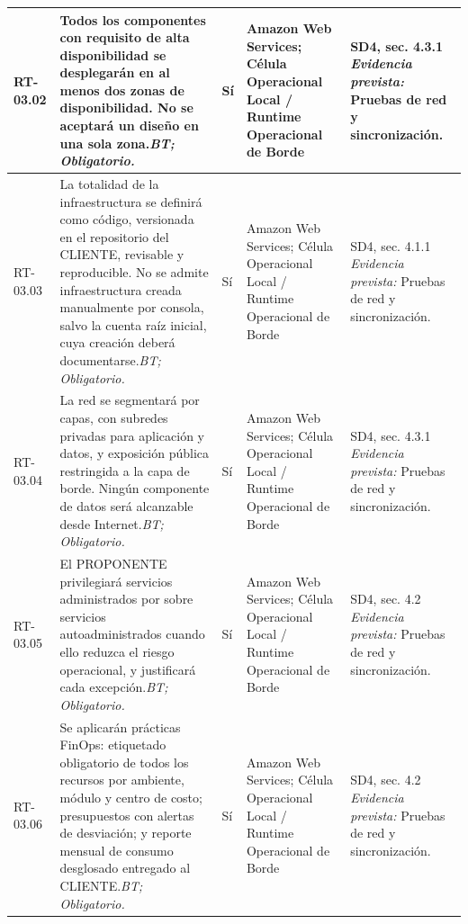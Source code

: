\begin{paginaHorizontalSynaptix}
\begin{longtable}{|L{0.09\AnchoMatrizTDoce}|L{0.385\AnchoMatrizTDoce}|L{0.065\AnchoMatrizTDoce}|L{0.18\AnchoMatrizTDoce}|L{0.28\AnchoMatrizTDoce}|}
RT-\allowbreak{}03.\allowbreak{}02 &
Todos los componentes con requisito de alta disponibilidad se desplegarán en al menos dos zonas de disponibilidad. No se aceptará un diseño en una sola zona.\newline\textit{BT; Obligatorio.} &
Sí &
Amazon Web Services; Célula Operacional Local / Runtime Operacional de Borde &
SD4, sec. 4.3.1 \newline\textit{Evidencia prevista:} Pruebas de red y sincronización. \\ \hline

RT-\allowbreak{}03.\allowbreak{}03 &
La totalidad de la infraestructura se definirá como código, versionada en el repositorio del CLIENTE, revisable y reproducible. No se admite infraestructura creada manualmente por consola, salvo la cuenta raíz inicial, cuya creación deberá documentarse.\newline\textit{BT; Obligatorio.} &
Sí &
Amazon Web Services; Célula Operacional Local / Runtime Operacional de Borde &
SD4, sec. 4.1.1 \newline\textit{Evidencia prevista:} Pruebas de red y sincronización. \\ \hline

RT-\allowbreak{}03.\allowbreak{}04 &
La red se segmentará por capas, con subredes privadas para aplicación y datos, y exposición pública restringida a la capa de borde. Ningún componente de datos será alcanzable desde Internet.\newline\textit{BT; Obligatorio.} &
Sí &
Amazon Web Services; Célula Operacional Local / Runtime Operacional de Borde &
SD4, sec. 4.3.1 \newline\textit{Evidencia prevista:} Pruebas de red y sincronización. \\ \hline

RT-\allowbreak{}03.\allowbreak{}05 &
El PROPONENTE privilegiará servicios administrados por sobre servicios autoadministrados cuando ello reduzca el riesgo operacional, y justificará cada excepción.\newline\textit{BT; Obligatorio.} &
Sí &
Amazon Web Services; Célula Operacional Local / Runtime Operacional de Borde &
SD4, sec. 4.2 \newline\textit{Evidencia prevista:} Pruebas de red y sincronización. \\ \hline

RT-\allowbreak{}03.\allowbreak{}06 &
Se aplicarán prácticas FinOps: etiquetado obligatorio de todos los recursos por ambiente, módulo y centro de costo; presupuestos con alertas de desviación; y reporte mensual de consumo desglosado entregado al CLIENTE.\newline\textit{BT; Obligatorio.} &
Sí &
Amazon Web Services; Célula Operacional Local / Runtime Operacional de Borde &
SD4, sec. 4.2 \newline\textit{Evidencia prevista:} Pruebas de red y sincronización. \\ \hline


\end{longtable}
\end{paginaHorizontalSynaptix}
